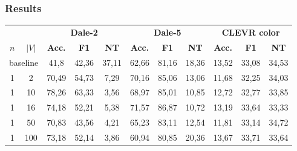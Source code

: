 \subsubsection*{Results}
\begin{table}[ht]
    \centering
    \begin{tabular}{cc|ccc|ccc|ccc}
        \toprule
                                      &        & \multicolumn{3}{c}{\textbf{Dale-2}} & \multicolumn{3}{c}{\textbf{Dale-5}} & \multicolumn{3}{c}{\textbf{CLEVR color}}                                                                                                     \\  \cmidrule(lr){3-5}\cmidrule(lr){6-8}\cmidrule(lr){9-11}
        $n$                           & $|V|$  & \textbf{Acc.}                       & \textbf{F1}                         & \textbf{NT}                              & \textbf{Acc.}    & \textbf{F1}      & \textbf{NT}     & \textbf{Acc.} & \textbf{F1} & \textbf{NT} \\\midrule
        \multicolumn{2}{c|}{baseline} & {41,8} & {42,36}                             & {37,11}                             & {62,66}                                  & {81,16}          & {18,36}          & {13,52}         & {33,08}       & {34,53}                   \\\midrule
        {1}                           & {2}    & {70,49}                             & {54,73}                             & {7,29}                                   & {70,16}          & {85,06}          & {13,06}         & {11,68}       & {32,25}     & {34,03}     \\
        {1}                           & {10}   & {78,26}                             & {63,33}                             & {3,56}                                   & {68,97}          & {85,01}          & {10,85}         & {12,72}       & {32,77}     & {33,85}     \\
        {1}                           & {16}   & {74,18}                             & {52,21}                             & {5,38}                                   & {71,57}          & {86,87}          & {10,72}         & {13,19}       & {33,64}     & {33,33}     \\
        {1}                           & {50}   & {70,83}                             & {43,56}                             & {4,21}                                   & {65,23}          & {83,11}          & {12,54}         & {11,81}       & {33,14}     & {34,72}     \\
        {1}                           & {100}  & {73,18}                             & {52,14}                             & {3,86}                                   & {60,94}          & {80,85}          & {20,36}         & {13,67}       & {33,71}     & {33,64}     \\

\end{tabular}
\end{table}
